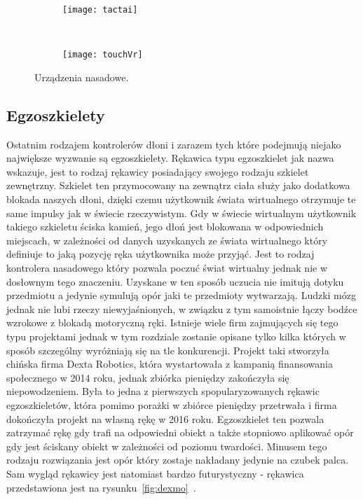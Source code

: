 \begin{figure}[h]
\centering
	\begin{subfigure}[b]{0.4\textwidth}
	\texttt{[image: tactai]}
	\label{fig:tactai}
	\end{subfigure}
	~
	\begin{subfigure}[b]{0.4\textwidth}
	\texttt{[image: touchVr]}
	\label{fig:touchVr}
	\end{subfigure}
\caption{Urządzenia nasadowe.}
\label{fig:tactails}
\end{figure}

	\subsection{Egzoszkielety}
	\label{subsec:egzo}	
	Ostatnim rodzajem kontrolerów dłoni i zarazem tych które podejmują niejako największe wyzwanie są egzoszkielety. Rękawica typu egzoszkielet jak nazwa wskazuje, jest to rodzaj rękawicy posiadający swojego rodzaju szkielet zewnętrzny. Szkielet ten przymocowany na zewnątrz ciała służy jako dodatkowa blokada naszych dłoni, dzięki czemu użytkownik świata wirtualnego otrzymuje te same impulsy jak w świecie rzeczywistym. Gdy w świecie wirtualnym użytkownik takiego szkieletu ściska kamień, jego dłoń jest blokowana w odpowiednich miejscach, w zależności od danych uzyskanych ze świata wirtualnego który definiuje to jaką pozycję ręka użytkownika może przyjąć. Jest to rodzaj kontrolera nasadowego który pozwala poczuć świat wirtualny jednak nie w dosłownym tego znaczeniu. Uzyskane w ten sposób uczucia nie imitują dotyku przedmiotu a jedynie symulują opór jaki te przedmioty wytwarzają. Ludzki mózg jednak nie lubi rzeczy niewyjaśnionych, w związku z tym samoistnie łączy bodźce wzrokowe z blokadą motoryczną ręki. Istnieje wiele firm zajmujących się tego typu projektami jednak w tym rozdziale zostanie opisane tylko kilka których w sposób szczególny wyróżniają się na tle konkurencji. Projekt taki stworzyła chińska firma Dexta Robotics, która wystartowała z kampanią finansowania społecznego w 2014 roku, jednak zbiórka pieniędzy zakończyła się niepowodzeniem. Była to jedna z pierwszych  spopularyzowanych rękawic egzoszkieletów, która pomimo porażki w zbiórce pieniędzy przetrwała i firma dokończyła projekt na własną rękę w 2016 roku. Egzoszkielet ten pozwala zatrzymać rękę gdy trafi na odpowiedni obiekt a także stopniowo aplikować opór gdy jest ściskany obiekt w zależności od poziomu twardości. Minusem tego rodzaju rozwiązania jest opór który zostaje nakładany jedynie na czubek palca. Sam wygląd rękawicy jest natomiast bardzo futurystyczny - rękawica przedstawiona jest na rysunku~\ref{fig:dexmo}~\cite{dexta}.
	

